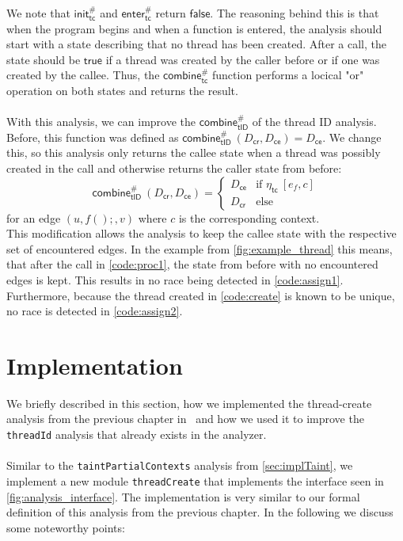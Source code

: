   We note that $\textsf{init}^{\#}_\textsf{tc}$ and $\textsf{enter}^{\#}_\textsf{tc}$ return $\textsf{false}$. The reasoning behind this is that when the program begins and when a function is entered, the analysis should start with a state describing that no thread has been created. After a call, the state should be $\textsf{true}$ if a thread was created by the caller before or if one was created by the callee. Thus, the $\textsf{combine}^{\#}_\textsf{tc}$ function performs a locical "or" operation on both states and returns the result.\\
  \\
  With this analysis, we can improve the $\textsf{combine}^{\#}_\textsf{tID}$ of the thread ID analysis. Before, this function was defined as $\textsf{combine}^{\#}_\textsf{tID}\ (D_\textsf{cr}, D_\textsf{ce}) = D_\textsf{ce}$. We change this, so this analysis only returns the callee state when a thread was possibly created in the call and otherwise returns the caller state from before:
  \[\textsf{combine}^{\#}_\textsf{tID}\ (D_\textsf{cr}, D_\textsf{ce}) = \left\{ \begin{array}{ll}
    D_\textsf{ce} & \text{if } \eta_\textsf{tc}\ [e_f,c]\\
    D_\textsf{cr} & \text{else}
  \end{array} \right.\]
  for an edge $(u, f();, v)$ where $c$ is the corresponding context.\\
  This modification allows the analysis to keep the callee state with the respective set of encountered edges. In the example from \autoref{fig:example_thread} this means, that after the call in \autoref{code:proc1}, the state from before with no encountered edges is kept. This results in no race being detected in \autoref{code:assign1}. Furthermore, because the thread created in \autoref{code:create} is known to be unique, no race is detected in \autoref{code:assign2}.

  \section{Implementation}
    We briefly described in this section, how we implemented the thread-create analysis from the previous chapter in \gob\ and how we used it to improve the \texttt{threadId} analysis that already exists in the analyzer.\\
    \\
    Similar to the \texttt{taintPartialContexts} analysis from \autoref{sec:implTaint}, we implement a new module \texttt{threadCreate} that implements the interface seen in \autoref{fig:analysis_interface}. The implementation is very similar to our formal definition of this analysis from the previous chapter. In the following we discuss some noteworthy points:\\


